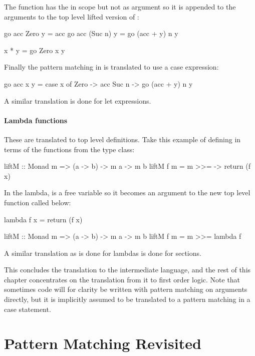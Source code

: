 \noindent
The  function has the  in scope but not as argument so it
is appended to the arguments to the top level lifted version of :

\begin{code}
go acc Zero    y = acc
go acc (Suc n) y = go (acc + y) n y

x * y = go Zero x y
\end{code}

\noindent
Finally the pattern matching in  is translated to use a case expression:

\begin{code}
go acc x y = case x of
     Zero  -> acc
     Suc n -> go (acc + y) n y
\end{code}

A similar translation is done for let expressions.

\paragraph{Lambda functions} These are translated to top level
definitions. Take this example of defining  in terms of the
functions from the  type class:

\begin{code}
liftM :: Monad m => (a -> b) -> m a -> m b
liftM f m = m >>= \x -> return (f x)
\end{code}

\noindent
In the lambda,  is a free variable so it becomes an argument to
the new top level function called  below:

\begin{code}
lambda f x = return (f x)

liftM :: Monad m => (a -> b) -> m a -> m b
liftM f m = m >>= lambda f
\end{code}

A similar translation as is done for lambdas is done for sections.

This concludes the translation to the intermediate language, and the
rest of this chapter concentrates on the translation from it to first
order logic. Note that sometimes code will for clarity be written with pattern
matching on arguments directly, but it is implicitly assumed to be
translated to a pattern matching in a case statement.

\section{Pattern Matching Revisited}
\label{sec:patternsrevisited}

